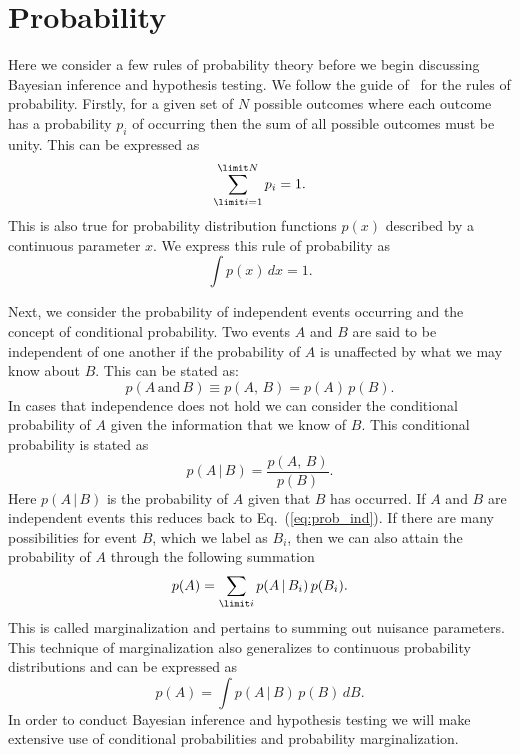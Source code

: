 \section{Probability}\label{sec:probability_basics}
Here we consider a few rules of probability theory before we begin discussing Bayesian inference and hypothesis testing. We follow the guide of~\cite{wall2012practical} for the rules of probability. Firstly, for a given set of $N$ possible outcomes where each outcome has a probability $p_i$ of occurring then the sum of all possible outcomes must be unity. This can be expressed as
\begin{equation}
 \sum_{\limit i=1}^{\limit N} p_i = 1.
\end{equation}
This is also true for probability distribution functions $p(x)$ described by a continuous parameter $x$. We express this rule of probability as
\begin{equation}
 \int p(x) \, dx = 1.
\end{equation}

Next, we consider the probability of independent events occurring and the concept of conditional probability. Two events $A$ and $B$ are said to be independent of one another if the probability of $A$ is unaffected by what we may know about $B$. This can be stated as:
\begin{equation}\label{eq:prob_ind}
 p(A \, \mathrm{and} \, B) \equiv p(A, \, B) = p(A) \, p(B).
\end{equation}
In cases that independence does not hold we can consider the conditional probability of $A$ given the information that we know of $B$. This conditional probability is stated as
\begin{equation}
   p(A \, | \, B) = \frac{p(A, \, B)}{p(B)}.
\end{equation}
Here $p(A \, | \, B)$ is the probability of $A$ given that $B$ has occurred. If $A$ and $B$ are independent events this reduces back to Eq.~(\ref{eq:prob_ind}). If there are many possibilities for event $B$, which we label as $B_i$, then we can also attain the probability of $A$ through the following summation
\begin{equation}\label{eq:prob_marginalization}
   p(A) = \sum_{\limit i} p(A \, | \, B_i) \, p(B_i).
\end{equation}
This is called marginalization and pertains to summing out nuisance parameters. This technique of marginalization also generalizes to continuous probability distributions and can be expressed as
\begin{equation}
   p(A) = \int p(A \, | \, B) \, p(B) \, dB.
\end{equation}
In order to conduct Bayesian inference and hypothesis testing we will make extensive use of conditional probabilities and probability marginalization.

